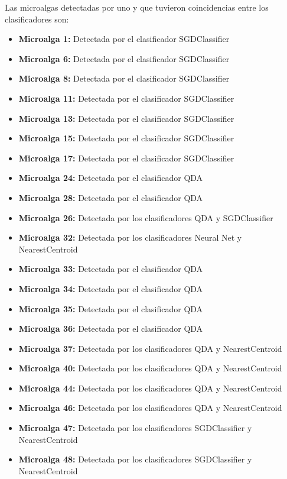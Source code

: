 \documentclass[conference]{IEEEtran}
\begin{document}
Las microalgas detectadas por uno y que tuvieron coincidencias entre los clasificadores son:
\begin{itemize}
    \item \textbf{Microalga 1:} Detectada por el clasificador SGDClassifier
    \item \textbf{Microalga 6:} Detectada por el clasificador SGDClassifier
    \item \textbf{Microalga 8:} Detectada por el clasificador SGDClassifier
    \item \textbf{Microalga 11:} Detectada por el clasificador SGDClassifier
    \item \textbf{Microalga 13:} Detectada por el clasificador SGDClassifier
    \item \textbf{Microalga 15:} Detectada por el clasificador SGDClassifier
    \item \textbf{Microalga 17:} Detectada por el clasificador SGDClassifier
    \item \textbf{Microalga 24:} Detectada por el clasificador QDA
    \item \textbf{Microalga 28:} Detectada por el clasificador QDA
    \item \textbf{Microalga 26:} Detectada por los clasificadores QDA y SGDClassifier
    \item \textbf{Microalga 32:} Detectada por los clasificadores Neural Net y NearestCentroid
    \item \textbf{Microalga 33:} Detectada por el clasificador QDA
    \item \textbf{Microalga 34:} Detectada por el clasificador QDA
    \item \textbf{Microalga 35:} Detectada por el clasificador QDA
    \item \textbf{Microalga 36:} Detectada por el clasificador QDA
    \item \textbf{Microalga 37:} Detectada por los clasificadores QDA y NearestCentroid
    \item \textbf{Microalga 40:} Detectada por los clasificadores QDA y NearestCentroid
    \item \textbf{Microalga 44:} Detectada por los clasificadores QDA y NearestCentroid
    \item \textbf{Microalga 46:} Detectada por los clasificadores QDA y NearestCentroid
    \item \textbf{Microalga 47:} Detectada por los clasificadores SGDClassifier y NearestCentroid
    \item \textbf{Microalga 48:} Detectada por los clasificadores SGDClassifier y NearestCentroid

\end{itemize}
\end{document}
